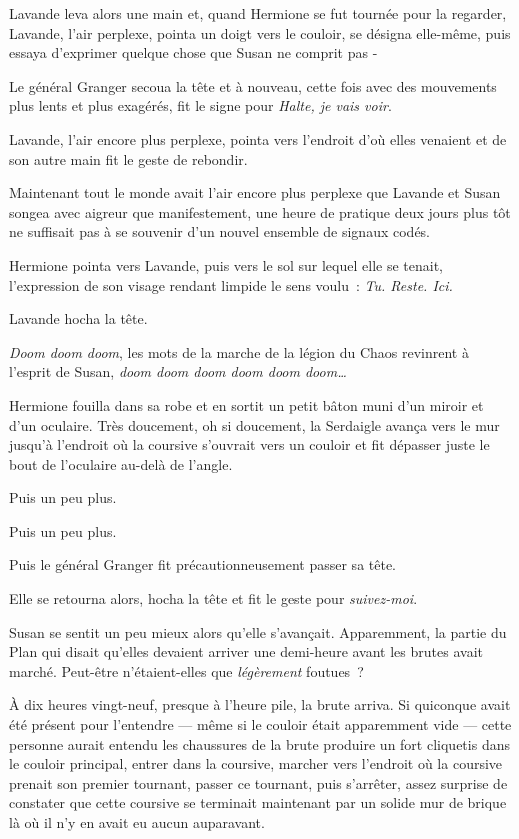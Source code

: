 Lavande leva alors une main et, quand Hermione se fut tournée pour la regarder, Lavande, l'air perplexe, pointa un doigt vers le couloir, se désigna elle-même, puis essaya d'exprimer quelque chose que Susan ne comprit pas -

Le général Granger secoua la tête et à nouveau, cette fois avec des mouvements plus lents et plus exagérés, fit le signe pour \emph{Halte, je vais voir}.

Lavande, l'air encore plus perplexe, pointa vers l'endroit d'où elles venaient et de son autre main fit le geste de rebondir.

Maintenant tout le monde avait l'air encore plus perplexe que Lavande et Susan songea avec aigreur que manifestement, une heure de pratique deux jours plus tôt ne suffisait pas à se souvenir d'un nouvel ensemble de signaux codés.

Hermione pointa vers Lavande, puis vers le sol sur lequel elle se tenait, l'expression de son visage rendant limpide le sens voulu~: \emph{Tu. Reste. Ici.}

Lavande hocha la tête.

\emph{Doom doom doom}, les mots de la marche de la légion du Chaos revinrent à l'esprit de Susan, \emph{doom doom doom doom doom doom…}\footnotemark{}

Hermione fouilla dans sa robe et en sortit un petit bâton muni d'un miroir et d'un oculaire. Très doucement, oh si doucement, la Serdaigle avança vers le mur jusqu'à l'endroit où la coursive s'ouvrait vers un couloir et fit dépasser juste le bout de l'oculaire au-delà de l'angle.

Puis un peu plus.

Puis un peu plus.

Puis le général Granger fit précautionneusement passer sa tête.

Elle se retourna alors, hocha la tête et fit le geste pour \emph{suivez-moi}.

Susan se sentit un peu mieux alors qu'elle s'avançait. Apparemment, la partie du Plan qui disait qu'elles devaient arriver une demi-heure avant les brutes avait marché. Peut-être n'étaient-elles que \emph{légèrement} foutues~?

\later

À dix heures vingt-neuf, presque à l'heure pile, la brute arriva. Si quiconque avait été présent pour l'entendre — même si le couloir était apparemment vide — cette personne aurait entendu les chaussures de la brute produire un fort cliquetis dans le couloir principal, entrer dans la coursive, marcher vers l'endroit où la coursive prenait son premier tournant, passer ce tournant, puis s'arrêter, assez surprise de constater que cette coursive se terminait maintenant par un solide mur de brique là où il n'y en avait eu aucun auparavant.

